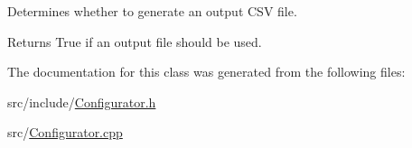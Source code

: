 Determines whether to generate an output C\+S\+V file. 

\begin{DoxyReturn}{Returns}
True if an output file should be used. 
\end{DoxyReturn}


The documentation for this class was generated from the following files\+:\begin{DoxyCompactItemize}
\item 
src/include/\hyperlink{_configurator_8h}{Configurator.\+h}\item 
src/\hyperlink{_configurator_8cpp}{Configurator.\+cpp}\end{DoxyCompactItemize}
